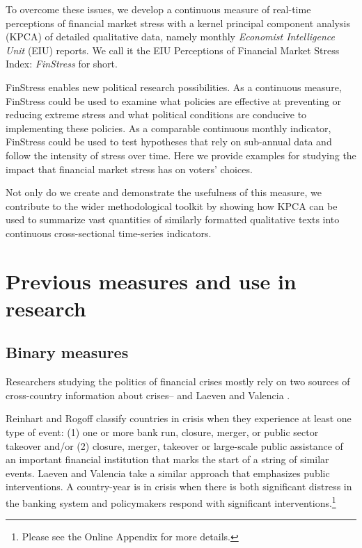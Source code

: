 \documentclass[]{article}
\begin{document}
To overcome these issues, we develop a continuous measure of real-time perceptions of financial market stress with a kernel principal component analysis (KPCA) of detailed qualitative data, namely monthly \emph{Economist Intelligence Unit} (EIU) reports. We call it the EIU Perceptions of Financial Market Stress Index: \emph{FinStress} for short.

FinStress enables new political research possibilities. As a continuous measure, FinStress could be used to examine what policies are effective at preventing or reducing extreme stress and what political conditions are conducive to implementing these policies. As a comparable continuous monthly indicator, FinStress could  be used to test hypotheses that rely on sub-annual data and follow the intensity of stress over time. Here we provide examples for studying the impact that financial market stress has on voters' choices.

Not only do we create and demonstrate the usefulness of this measure, we contribute to the wider methodological toolkit by showing how KPCA can be used to summarize vast quantities of similarly formatted qualitative texts into continuous cross-sectional time-series indicators.

\section{Previous measures and use in research}\label{motivation}

\subsection{Binary measures}

Researchers studying the politics of financial crises mostly rely on two sources of cross-country information about crises--\cite{Reinhart2009,ReinhartRog2010} and Laeven and Valencia \citeyearpar[and their predecessors]{laeven2013}.

Reinhart and Rogoff \citeyearpar[10]{Reinhart2009,ReinhartRog2010} classify countries in crisis when they experience at least one type of event: (1) one or more bank run, closure, merger, or public sector takeover and/or (2) closure, merger, takeover or large-scale public assistance of an important financial institution that marks the start of a string of similar events. Laeven and Valencia \citeyearpar[228]{laeven2013} take a similar approach that emphasizes public interventions. A country-year is in crisis when there is both significant distress in the banking system and policymakers respond with significant interventions.\footnote{Please see the Online Appendix for more details.}
\end{document}
